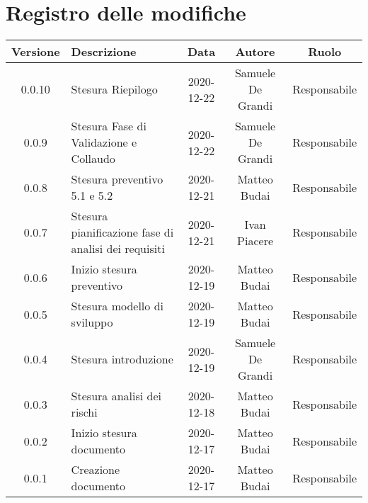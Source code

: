 \section*{Registro delle modifiche}

\begin{center}
	\begin{longtable}{|c|p{5cm}|c|c|c|}
	\hline
	\rowcolor{lighter-grayer}
	\textbf{Versione} & \textbf{Descrizione} & \textbf{Data} & \textbf{Autore} & \textbf{Ruolo} \\
	\hline
	\endfirsthead

	0.0.10 & Stesura Riepilogo & 2020-12-22 & Samuele De Grandi & Responsabile \\
	0.0.9 & Stesura Fase di Validazione e Collaudo & 2020-12-22 & Samuele De Grandi & Responsabile \\
	\hline
	0.0.8 & Stesura preventivo 5.1 e 5.2 & 2020-12-21 & Matteo Budai & Responsabile \\
	\hline
	0.0.7 & Stesura pianificazione fase di analisi dei requisiti & 2020-12-21 & Ivan Piacere & Responsabile \\
	\hline
	0.0.6 & Inizio stesura preventivo & 2020-12-19 & Matteo Budai & Responsabile \\
	\hline
	0.0.5 & Stesura modello di sviluppo & 2020-12-19 & Matteo Budai & Responsabile \\
	\hline
	0.0.4 & Stesura introduzione & 2020-12-19 & Samuele De Grandi & Responsabile \\
	\hline
	0.0.3 & Stesura analisi dei rischi & 2020-12-18 & Matteo Budai & Responsabile \\
	\hline
	0.0.2 & Inizio stesura documento & 2020-12-17 & Matteo Budai & Responsabile \\
	\hline
	0.0.1 & Creazione documento & 2020-12-17 & Matteo Budai & Responsabile \\
	\hline

	\end{longtable}
\end{center}